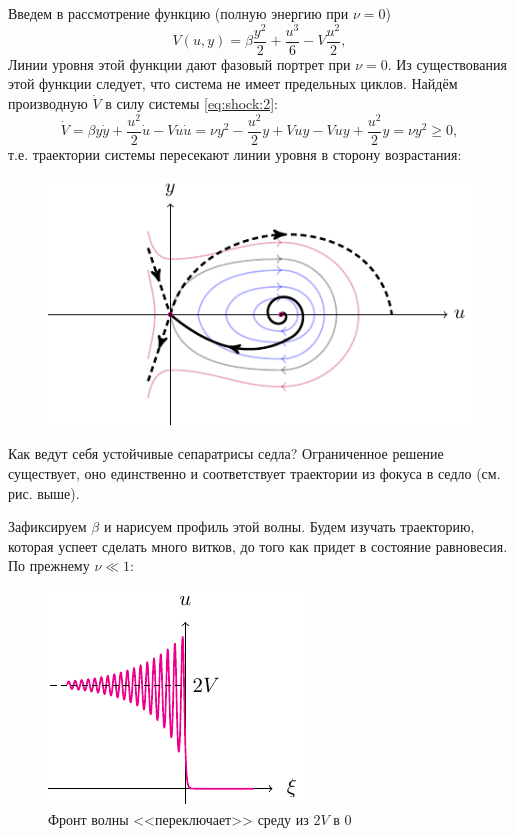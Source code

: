 Введем в рассмотрение функцию (полную энергию при $\nu=0$)
\begin{equation*}
	V(u,y)=\beta\frac{y^2}{2}+\frac{u^3}{6}-V\frac{u^2}{2},
\end{equation*}
Линии уровня этой функции дают фазовый портрет при $\nu=0$.  Из существования этой функции следует, что система не имеет предельных циклов. 
Найдём производную $\dot{V}$ в силу системы \eqref{eq:shock:2}:
\begin{equation*}
	\dot{V}=\beta y \dot{y}+\frac{u^2}{2}\dot{u}-Vu\dot{u}=\nu y^2-\frac{u^2}{2}y+Vuy-Vuy+\frac{u^2}{2}y=\nu y^2\geqslant 0,
\end{equation*}
т.е. траектории системы пересекают линии уровня в сторону возрастания:
\begin{figure}[H]
	\centering
	\includegraphics[scale=1.5]{img/shock_waves/phase_portrait}
\end{figure}
Как ведут себя устойчивые сепаратрисы седла? Ограниченное решение существует, оно единственно и соответствует траектории из фокуса в седло (см. рис. выше). 




Зафиксируем $\beta$ и нарисуем профиль этой волны. Будем изучать траекторию, которая успеет сделать много витков, до того как придет в состояние равновесия. По прежнему $\nu\ll1$:
\begin{figure}[H]
	\centering
	\includegraphics[scale=1.5]{img/shock_waves/shock} 
	\caption{Фронт волны <<переключает>> среду из $2V$ в $0$}
\end{figure}

